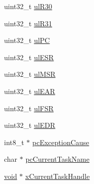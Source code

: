 \begin{DoxyCompactItemize}
\item 
uint32\-\_\-t \hyperlink{structPORT__REGISTER__DUMP_afc4bab00e0d54aa8e6515d01cf899447}{ul\-R30}
\item 
uint32\-\_\-t \hyperlink{structPORT__REGISTER__DUMP_a0d3ebc97a28e050c9e7fe0594bb5634e}{ul\-R31}
\item 
uint32\-\_\-t \hyperlink{structPORT__REGISTER__DUMP_ad9bd9ab097a6c401988ab4115078228e}{ul\-P\-C}
\item 
uint32\-\_\-t \hyperlink{structPORT__REGISTER__DUMP_ac9530e16b33528b3b7d00d360631e71d}{ul\-E\-S\-R}
\item 
uint32\-\_\-t \hyperlink{structPORT__REGISTER__DUMP_a040e5136d31585f721a40093e05b90bf}{ul\-M\-S\-R}
\item 
uint32\-\_\-t \hyperlink{structPORT__REGISTER__DUMP_a8889f09f9303f218b28daf14f6855660}{ul\-E\-A\-R}
\item 
uint32\-\_\-t \hyperlink{structPORT__REGISTER__DUMP_ae8c8cd829c8754de56b7ab1378238fc7}{ul\-F\-S\-R}
\item 
uint32\-\_\-t \hyperlink{structPORT__REGISTER__DUMP_a86c831f81b395df46585c668ff0c6d8e}{ul\-E\-D\-R}
\item 
int8\-\_\-t $\ast$ \hyperlink{structPORT__REGISTER__DUMP_a2f8d38fdae7d22166e6eaf44fd0c84c5}{pc\-Exception\-Cause}
\item 
char $\ast$ \hyperlink{structPORT__REGISTER__DUMP_aefca0ee75129a21a1adfb17edc4bf8a8}{pc\-Current\-Task\-Name}
\item 
\hyperlink{Paradigm_2Tern__EE_2small_2portmacro_8h_a14d32f8130d3c0b212cfc751730b5b49}{void} $\ast$ \hyperlink{structPORT__REGISTER__DUMP_a40972c15da30cd54bcc8ec97e4b5db7b}{x\-Current\-Task\-Handle}
\end{DoxyCompactItemize}


